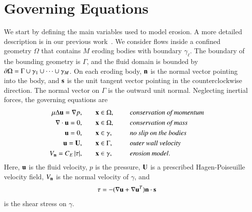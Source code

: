 \documentclass[preprint, 10pt]{elsarticle}
\begin{document}
\section{Governing Equations}
\label{sec:formulation}
We start by defining the main variables used to model erosion.  A more
detailed description is in our previous work~\cite{qua-moo2018}.  We
consider flows inside a confined geometry $\Omega$ that contains $M$
eroding bodies with boundary $\gamma_\ell$.  The boundary of the
bounding geometry is $\Gamma$, and the fluid domain is bounded by $\bd
\Omega = \Gamma \cup \gamma_1 \cup \cdots \cup \gamma_M$.  On each
eroding body, $\nn$ is the normal vector pointing into the body, and
$\ss$ is the unit tangent vector pointing in the counterclockwise
direction.  The normal vector on $\Gamma$ is the outward unit normal.
Neglecting inertial forces, the governing equations are
\begin{equation}
\label{eqn:erosionModel}
  \begin{split}
    \mu \Delta \uu = \grad p, &\hspace{20pt} \xx \in \Omega, \gap 
      &&\mbox{\em conservation of momentum}\\
    \grad \cdot \uu = 0, &\hspace{20pt} \xx \in \Omega, \gap 
      &&\mbox{\em conservation of mass} \\
    \uu = 0, &\hspace{20pt} \xx \in \gamma, \gap 
      &&\mbox{\em no slip on the bodies} \\
    \uu = \UU, &\hspace{20pt} \xx \in \Gamma, \gap 
      &&\mbox{\em outer wall velocity} \\
    \Vn = \CE \, \abs{\tau}, &\hspace{20pt} \xx \in \gamma,
      &&\mbox{\em erosion model}.
  \end{split}
\end{equation}
Here, $\uu$ is the fluid velocity, $p$ is the pressure, $\UU$ is a
prescribed Hagen-Poiseuille velocity field, $\Vn$ is the normal velocity
of $\gamma$, and
\begin{align}
  \tau = -(\nabla \uu + \nabla \uu^T) \nn \cdot \ss
  \label{eqn:shearStress}
\end{align}
is the shear stress on $\gamma$.
\end{document}
